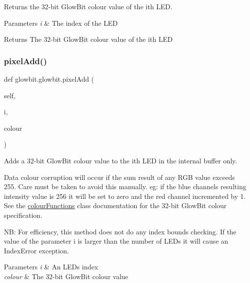 Returns the 32-\/bit Glow\+Bit colour value of the i\textquotesingle{}th L\+ED. 


\begin{DoxyParams}{Parameters}
{\em i} & The index of the L\+ED \\
\hline
\end{DoxyParams}
\begin{DoxyReturn}{Returns}
The 32-\/bit Glow\+Bit colour value of the i\textquotesingle{}th L\+ED 
\end{DoxyReturn}
\mbox{\label{classglowbit_1_1glowbit_a8bb7ba36b4b7746f215ebad1acc0f5e2}} 
\subsubsection{\texorpdfstring{pixel\+Add()}{pixelAdd()}}
{\footnotesize\ttfamily def glowbit.\+glowbit.\+pixel\+Add (\begin{DoxyParamCaption}\item[{}]{self,  }\item[{}]{i,  }\item[{}]{colour }\end{DoxyParamCaption})}



Adds a 32-\/bit Glow\+Bit colour value to the i\textquotesingle{}th L\+ED in the internal buffer only. 

Data colour corruption will occur if the sum result of any R\+GB value exceeds 255. Care must be taken to avoid this manually. eg\+: if the blue channel\textquotesingle{}s resulting intensity value is 256 it will be set to zero and the red channel incremented by 1. See the \hyperlink{classglowbit_1_1colourFunctions}{colour\+Functions} class documentation for the 32-\/bit Glow\+Bit colour specification.

NB\+: For efficiency, this method does not do any index bounds checking. If the value of the parameter i is larger than the number of L\+E\+Ds it will cause an Index\+Error exception.


\begin{DoxyParams}{Parameters}
{\em i} & An L\+ED\textquotesingle{}s index \\
\hline
{\em colour} & The 32-\/bit Glow\+Bit colour value \\
\hline
\end{DoxyParams}
\mbox{\label{classglowbit_1_1glowbit_a6184de87721652f9f55f9301f6a3a9ce}} 
